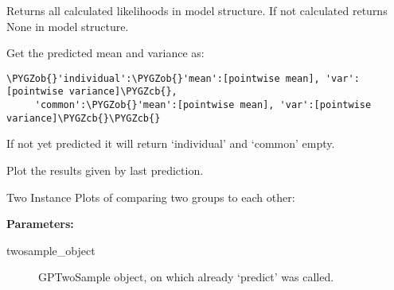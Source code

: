 \documentclass[letterpaper,10pt]{sphinxmanual}
\def\PYGZob{\char`\{}
\def\PYGZcb{\char`\}}
\begin{document}
\begin{fulllineitems}
\begin{fulllineitems}
\end{fulllineitems}


\begin{fulllineitems}
\label{base:gptwosample.twosample.twosample_base.TwoSampleBase.get_model_likelihoods}
Returns all calculated likelihoods in model structure. If not calculated returns None in model structure.

\end{fulllineitems}


\begin{fulllineitems}
\label{base:gptwosample.twosample.twosample_base.TwoSampleBase.get_predicted_mean_variance}
Get the predicted mean and variance as:

\begin{Verbatim}[commandchars=\\\{\}]
\PYGZob{}'individual':\PYGZob{}'mean':[pointwise mean], 'var':[pointwise variance]\PYGZcb{},
     'common':\PYGZob{}'mean':[pointwise mean], 'var':[pointwise variance]\PYGZcb{}\PYGZcb{}
\end{Verbatim}

If not yet predicted it will return `individual' and `common' empty.

\end{fulllineitems}


\begin{fulllineitems}
\label{base:gptwosample.twosample.twosample_base.TwoSampleBase.plot}
Plot the results given by last prediction.

Two Instance Plots of comparing two groups to each other:

\textbf{Parameters:}
\begin{description}
\item[{twosample\_object}] \leavevmode{[}\code{gptwosample.twosample}{]}
GPTwoSample object, on which already `predict' was called.


\end{description}
\end{fulllineitems}
\end{fulllineitems}
\end{document}
